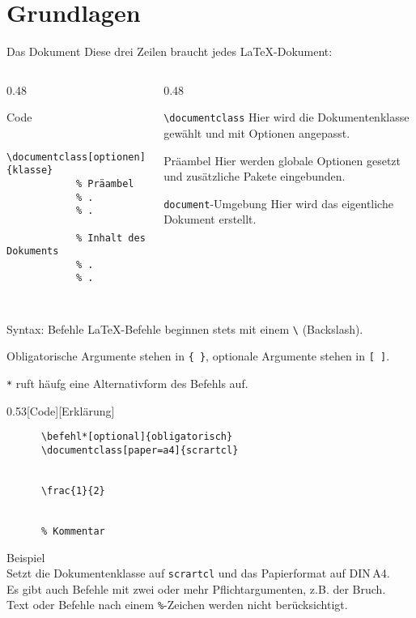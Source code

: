 \section{Grundlagen}

\begin{frame}[fragile]{Das Dokument}
  Diese drei Zeilen braucht jedes \LaTeX-Dokument:
  \begin{columns}[onlytextwidth, t]
    \begin{column}{0.48\textwidth}
      \begin{block}{Code}
        \begin{lstlisting}
          \documentclass[optionen]{klasse}
            % Präambel
            % .
            % .
          
            % Inhalt des Dokuments
            % .
            % .
          
        \end{lstlisting}
      \end{block}
    \end{column}
    \begin{column}{0.48\textwidth}
      \begin{block}{\texttt{\textbackslash documentclass}}
        Hier wird die Dokumentenklasse gewählt und mit Optionen angepasst.
      \end{block}
      \begin{block}{Präambel}
        Hier werden globale Optionen gesetzt und zusätzliche Pakete eingebunden.
      \end{block}
      \begin{block}{\texttt{document}-Umgebung}
        Hier wird das eigentliche Dokument erstellt.
      \end{block}
    \end{column}
  \end{columns}
\end{frame}

\begin{frame}[fragile]{Syntax: Befehle}
  \LaTeX-Befehle beginnen stets mit einem \verb+\+ (Backslash).

  Obligatorische Argumente stehen in \lstinline+{ }+, optionale Argumente stehen in \lstinline+[ ]+.

  \verb+*+ ruft häufg eine Alternativform des Befehls auf.
  \begin{CodeExample}{0.53}[Code][Erklärung]
    \begin{lstlisting}
      \befehl*[optional]{obligatorisch}
      \documentclass[paper=a4]{scrartcl}


      \frac{1}{2}


      % Kommentar
    \end{lstlisting}
  \CodeResult
    Beispiel \\
    Setzt die Dokumentenklasse auf \texttt{scrartcl} und das Papierformat auf DIN\,A4. \\
    Es gibt auch Befehle mit zwei oder mehr Pflichtargumenten, z.B. der Bruch. \\
    Text oder Befehle nach einem \verb+%+-Zeichen werden nicht berücksichtigt.
  \end{CodeExample}
\end{frame}

